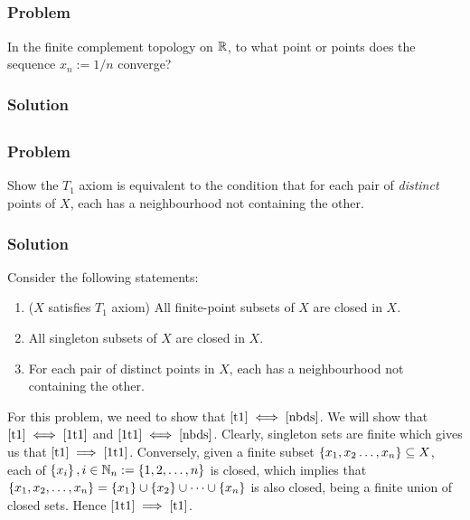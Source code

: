 
\subsection{}

\subsubsection{Problem}
In the finite complement topology on $\mathbb R$, to what point or points does the sequence $x_n := 1/n$ converge?

\subsubsection{Solution}
\todo


\subsection{}

\subsubsection{Problem}
Show the $T_1$ axiom is equivalent to the condition that for each pair of \emph{distinct} points of $X$, each has a neighbourhood not containing the other.

\subsubsection{Solution}
Consider the following  statements:
\begin{enumerate}
\item\label{t1} ($X$ satisfies $T_1$ axiom) All finite-point subsets of $X$ are closed in $X$.
\item\label{1t1} All singleton subsets of $X$ are closed in $X$.
\item\label{nbds} For each pair of distinct points in $X$, each has a neighbourhood not containing the other.
\end{enumerate}
For this problem, we need to show that $\ref{t1} \iff \ref{nbds}$. We will show that $\ref{t1} \iff \ref{1t1}$ and $\ref{1t1} \iff \ref{nbds}$.
Clearly, singleton sets are finite which gives us that $\ref{t1} \implies \ref{1t1}$. Conversely, given a finite subset $\left\{ x_1, x_2 \dots, x_n \right\} \subseteq X$, each of $\left\{ x_i \right\}, i \in \mathbb N_n := \left\{ 1, 2, \dots, n \right\}$ is closed, which implies that $\left\{ x_1, x_2, \dots, x_n \right\} = \left\{ x_1 \right\} \cup \left\{ x_2 \right\} \cup \dots \cup \left\{ x_n \right\}$ is also closed, being a finite union of closed sets. Hence $\ref{1t1} \implies \ref{t1}$.
\medskip

